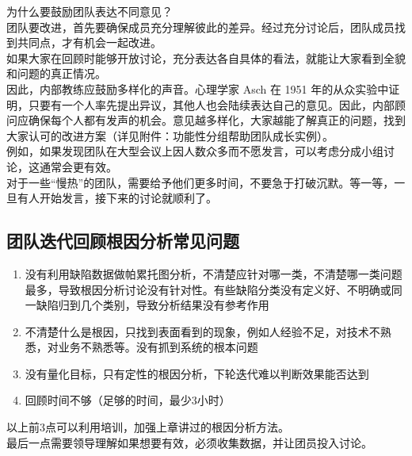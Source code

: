 为什么要鼓励团队表达不同意见？\\
团队要改进，首先要确保成员充分理解彼此的差异。经过充分讨论后，团队成员找到共同点，才有机会一起改进。\\
如果大家在回顾时能够开放讨论，充分表达各自具体的看法，就能让大家看到全貌和问题的真正情况。\\
因此，内部教练应鼓励多样化的声音。心理学家 Asch 在 1951
年的从众实验中证明，只要有一个人率先提出异议，其他人也会陆续表达自己的意见。因此，内部顾问应确保每个人都有发声的机会。意见越多样化，大家越能了解真正的问题，找到大家认可的改进方案（详见附件：功能性分组帮助团队成长实例）。\\
例如，如果发现团队在大型会议上因人数众多而不愿发言，可以考虑分成小组讨论，这通常会更有效。\\
对于一些``慢热''的团队，需要给予他们更多时间，不要急于打破沉默。等一等，一旦有人开始发言，接下来的讨论就顺利了。\\

\hypertarget{ux56e2ux961fux8fedux4ee3ux56deux987eux6839ux56e0ux5206ux6790ux5e38ux89c1ux95eeux9898}{%
\subsection{团队迭代回顾根因分析常见问题}\label{ux56e2ux961fux8fedux4ee3ux56deux987eux6839ux56e0ux5206ux6790ux5e38ux89c1ux95eeux9898}}

\begin{enumerate}
\tightlist
\item
  没有利用缺陷数据做帕累托图分析，不清楚应针对哪一类，不清楚哪一类问题最多，导致根因分析讨论没有针对性。有些缺陷分类没有定义好、不明确或同一缺陷归到几个类别，导致分析结果没有参考作用
\item
  不清楚什么是根因，只找到表面看到的现象，例如人经验不足，对技术不熟悉，对业务不熟悉等。没有抓到系统的根本问题
\item
  没有量化目标，只有定性的根因分析，下轮迭代难以判断效果能否达到
\item
  回顾时间不够（足够的时间，最少3小时）
\end{enumerate}

以上前3点可以利用培训，加强上章讲过的根因分析方法。\\
最后一点需要领导理解如果想要有效，必须收集数据，并让团员投入讨论。

